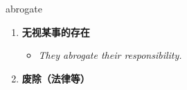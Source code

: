 
\begin{frame}
{\huge abrogate}
\begin{center}
\begin{enumerate}\Large
  \item \textbf{无视某事的存在}
  \begin{itemize}
    \item \em{\Large{They abrogate their responsibility.}}
  \end{itemize}
  \item \textbf{废除（法律等）}
\end{enumerate}
\end{center}
\end{frame}
